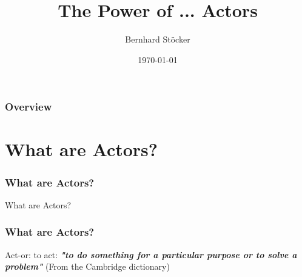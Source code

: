 \documentclass{beamer}
\title[The Power of Actors]{The Power of \cancel{LOVE}... Actors} %
\author{Bernhard St\"ocker} %
\institute[UCLA] %
{
Recogizer Group GmbH\\ %
\medskip
\textit{bernhard.stoecker@recogizer.de} %
}
\date{\today} %
\begin{document}
\begin{frame}
\titlepage %
\end{frame}

\begin{frame}
\frametitle{Overview} %
\tableofcontents %
\end{frame}


\section{What are Actors?} %


\begin{frame}
\frametitle{What are Actors?}
\Huge{\centerline{What are Actors?}}
\end{frame}


\begin{frame}
\frametitle{What are Actors?}
Act-or: to act: \textbf{\emph{"to do something for a particular purpose or to solve a problem"}} (From the Cambridge dictionary)
\end{frame}
\end{document}
